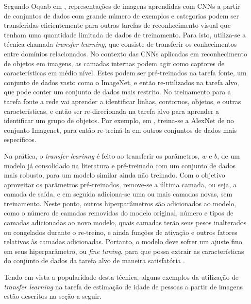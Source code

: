Segundo Oquab em \cite{oquab2014learning}, representações de imagens aprendidas com CNNs a partir de conjuntos de dados com grande número de exemplos e categorias podem ser transferidas eficientemente para outras tarefas de reconhecimento visual que tenham uma quantidade limitada de dados de treinamento. Para isto, utiliza-se a técnica chamada \emph{transfer learning}, que consiste de transferir os conhecimentos entre domínios relacionados. No contexto das CNNs aplicadas em reconhecimento de objetos em imagens, as camadas internas podem agir como captores de características em médio nível. Estes podem ser pré-treinados na tarefa fonte, um conjunto de dados vasto como o ImageNet, e então re-utilizados na tarefa alvo, que pode conter um conjunto de dados mais restrito. No treinamento para a tarefa fonte a rede vai aprender a identificar linhas, contornos, objetos, e outras características, e então ser re-direcionada na tarefa alvo para aprender a identificar um grupo de objetos. Por exemplo, em \cite{zeiler2014visualizing}, treina-se a AlexNet de \cite{alexnet} no conjunto Imagenet, para então re-treiná-la em outros conjuntos de dados mais específicos.

Na prática, o \emph{transfer learinng} é feito ao transferir os parâmetros, $w$ e $b$, de um modelo já consolidado na literatura e pré-treinado com um conjunto de dados mais robusto, para um modelo similar ainda não treinado. Com o objetivo aproveitar os parâmetros pré-treinados, remove-se a última camada, ou seja, a camada de saída, e em seguida adiciona-se uma ou mais camadas novas, sem treinamento. Neste ponto, outros hiperparâmetros são adicionados ao modelo, como o número de camadas removidas do modelo original, número e tipos de camadas adicionadas ao novo modelo, quais camadas terão seus pesos inalterados ou congelados durante o re-treino, e ainda funções de ativação e outros fatores relativos às camadas adicionadas. Portanto, o modelo deve sofrer um ajuste fino em seus hiperparâmetro, ou \emph{fine tuning}, para que possa extrair as características do conjunto de dados da tarefa alvo de maneira satisfatória \cite{oquab2014learning}.

Tendo em vista a popularidade desta técnica, alguns exemplos da utilização de \emph{transfer learning} na tarefa de estimação de idade de pessoas a partir de imagens estão descritos na seção a seguir.
